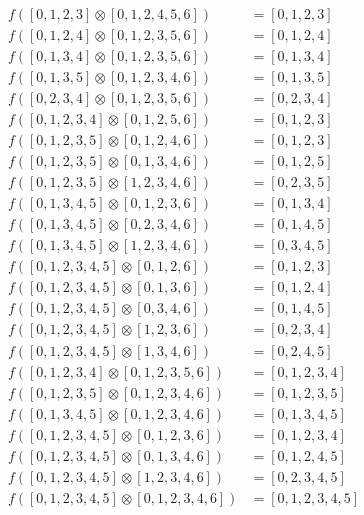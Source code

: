 \begin{align*}
f( [0, 1, 2, 3] \otimes [0, 1, 2, 4, 5, 6] )&= [0, 1, 2, 3] \\
f( [0, 1, 2, 4] \otimes [0, 1, 2, 3, 5, 6] )&= [0, 1, 2, 4] \\
f( [0, 1, 3, 4] \otimes [0, 1, 2, 3, 5, 6] )&= [0, 1, 3, 4] \\
f( [0, 1, 3, 5] \otimes [0, 1, 2, 3, 4, 6] )&= [0, 1, 3, 5] \\
f( [0, 2, 3, 4] \otimes [0, 1, 2, 3, 5, 6] )&= [0, 2, 3, 4] \\
f( [0, 1, 2, 3, 4] \otimes [0, 1, 2, 5, 6] )&= [0, 1, 2, 3] \\
f( [0, 1, 2, 3, 5] \otimes [0, 1, 2, 4, 6] )&= [0, 1, 2, 3] \\
f( [0, 1, 2, 3, 5] \otimes [0, 1, 3, 4, 6] )&= [0, 1, 2, 5] \\
f( [0, 1, 2, 3, 5] \otimes [1, 2, 3, 4, 6] )&= [0, 2, 3, 5] \\
f( [0, 1, 3, 4, 5] \otimes [0, 1, 2, 3, 6] )&= [0, 1, 3, 4] \\
f( [0, 1, 3, 4, 5] \otimes [0, 2, 3, 4, 6] )&= [0, 1, 4, 5] \\
f( [0, 1, 3, 4, 5] \otimes [1, 2, 3, 4, 6] )&= [0, 3, 4, 5] \\
f( [0, 1, 2, 3, 4, 5] \otimes [0, 1, 2, 6] )&= [0, 1, 2, 3] \\
f( [0, 1, 2, 3, 4, 5] \otimes [0, 1, 3, 6] )&= [0, 1, 2, 4] \\
f( [0, 1, 2, 3, 4, 5] \otimes [0, 3, 4, 6] )&= [0, 1, 4, 5] \\
f( [0, 1, 2, 3, 4, 5] \otimes [1, 2, 3, 6] )&= [0, 2, 3, 4] \\
f( [0, 1, 2, 3, 4, 5] \otimes [1, 3, 4, 6] )&= [0, 2, 4, 5] \\
f( [0, 1, 2, 3, 4] \otimes [0, 1, 2, 3, 5, 6] )&= [0, 1, 2, 3, 4] \\
f( [0, 1, 2, 3, 5] \otimes [0, 1, 2, 3, 4, 6] )&= [0, 1, 2, 3, 5] \\
f( [0, 1, 3, 4, 5] \otimes [0, 1, 2, 3, 4, 6] )&= [0, 1, 3, 4, 5] \\
f( [0, 1, 2, 3, 4, 5] \otimes [0, 1, 2, 3, 6] )&= [0, 1, 2, 3, 4] \\
f( [0, 1, 2, 3, 4, 5] \otimes [0, 1, 3, 4, 6] )&= [0, 1, 2, 4, 5] \\
f( [0, 1, 2, 3, 4, 5] \otimes [1, 2, 3, 4, 6] )&= [0, 2, 3, 4, 5] \\
f( [0, 1, 2, 3, 4, 5] \otimes [0, 1, 2, 3, 4, 6] )&= [0, 1, 2, 3, 4, 5] \\
\end{align*}

